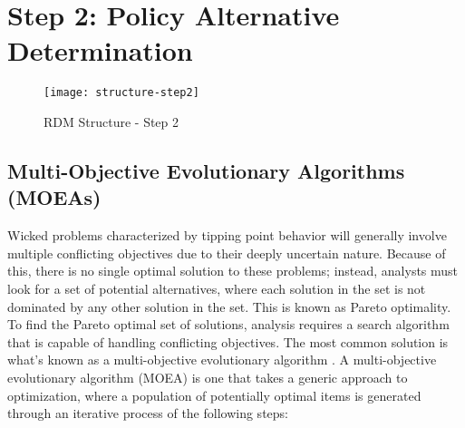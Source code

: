 \chapter{Step 2: Policy Alternative Determination}\label{dev-step2}

\begin{abstract}
    The second step in an RDM-based analysis is the policy alternative determination process, also referred to as the search phase. This research divides step 2 into three distinct parts. \cref{step2-moea} will establish the search algorithm that is used to find policy alternatives. Next, the different mechanisms for comparing potential alternatives is discussed in \cref{step2-scenarios}. Because this research includes seed analysis to manage the impact of randomness on the MOEA search, the final stage, \cref{step2-pareto} describes the process in which alternatives that are identified in each search repetition are put through a final selection process using an $\epsilon$-based Pareto sorting algorithm. 
\end{abstract}

\medskip

\begin{figure}[h]
    \centering
    \captionsetup{justification=centering}
    
    \texttt{[image: structure-step2]}
    \caption{RDM Structure - Step 2}
    \label{fig:structure-step2}
\end{figure}

\newpage

\section{Multi-Objective Evolutionary Algorithms (MOEAs)} \label{step2-moea}
Wicked problems characterized by tipping point behavior will generally involve multiple conflicting objectives due to their deeply uncertain nature. Because of this, there is no single optimal solution to these problems; instead, analysts must look for a set of potential alternatives, where each solution in the set is not dominated by any other solution in the set. This is known as Pareto optimality. To find the Pareto optimal set of solutions, analysis requires a search algorithm that is capable of handling conflicting objectives. The most common solution is what's known as a multi-objective evolutionary algorithm \citep{Maier2014, Reed2013}. A multi-objective evolutionary algorithm (MOEA) is one that takes a generic approach to optimization, where a population of potentially optimal items is generated through an iterative process of the following steps: 

